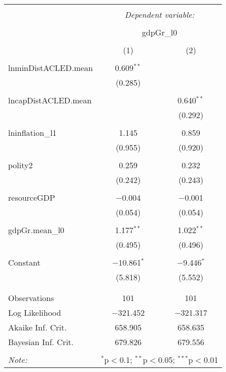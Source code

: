 
\begin{table}[!htbp] \centering 
  \caption{} 
  \label{} 
\begin{tabular}{@{\extracolsep{5pt}}lcc} 
\\[-1.8ex]\hline 
\hline \\[-1.8ex] 
 & \multicolumn{2}{c}{\textit{Dependent variable:}} \\ 
\cline{2-3} 
\\[-1.8ex] & \multicolumn{2}{c}{gdpGr\_l0} \\ 
\\[-1.8ex] & (1) & (2)\\ 
\hline \\[-1.8ex] 
 lnminDistACLED.mean & 0.609$^{**}$ &  \\ 
  & (0.285) &  \\ 
  & & \\ 
 lncapDistACLED.mean &  & 0.640$^{**}$ \\ 
  &  & (0.292) \\ 
  & & \\ 
 lninflation\_l1 & 1.145 & 0.859 \\ 
  & (0.955) & (0.920) \\ 
  & & \\ 
 polity2 & 0.259 & 0.232 \\ 
  & (0.242) & (0.243) \\ 
  & & \\ 
 resourceGDP & $-$0.004 & $-$0.001 \\ 
  & (0.054) & (0.054) \\ 
  & & \\ 
 gdpGr.mean\_l0 & 1.177$^{**}$ & 1.022$^{**}$ \\ 
  & (0.495) & (0.496) \\ 
  & & \\ 
 Constant & $-$10.861$^{*}$ & $-$9.446$^{*}$ \\ 
  & (5.818) & (5.552) \\ 
  & & \\ 
\hline \\[-1.8ex] 
Observations & 101 & 101 \\ 
Log Likelihood & $-$321.452 & $-$321.317 \\ 
Akaike Inf. Crit. & 658.905 & 658.635 \\ 
Bayesian Inf. Crit. & 679.826 & 679.556 \\ 
\hline 
\hline \\[-1.8ex] 
\textit{Note:}  & \multicolumn{2}{r}{$^{*}$p$<$0.1; $^{**}$p$<$0.05; $^{***}$p$<$0.01} \\ 
\end{tabular} 
\end{table}  

